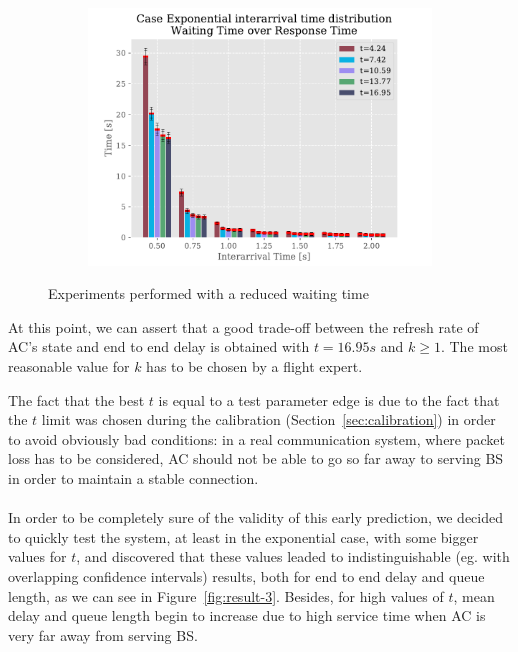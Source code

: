 \documentclass[a4paper,12pt]{article}
\begin{document}
\begin{figure}[H]
\begin{subfigure}[b]{.3\textwidth}
  \end{subfigure}
  ~
  \begin{subfigure}[b]{.3\textwidth}
    \includegraphics[width=\textwidth]{img/WaitingTimeOverResponseTimeP1Exp.pdf}
  \end{subfigure}
  \caption{Experiments performed with a reduced waiting time}
  \label{fig:result-2}
\end{figure}

At this point, we can assert that a good trade-off between the refresh rate of AC's state and end to end delay is obtained with $t=16.95s$ and $k \geq 1$.
The most reasonable value for $k$ has to be chosen by a flight expert.

The fact that the best $t$ is equal to a test parameter edge is due to the fact that the $t$ limit was chosen during the calibration (Section~\ref{sec:calibration}) in order to avoid obviously bad conditions: in a real communication system, where packet loss has to be considered, AC should not be able to go so far away to serving BS in order to maintain a stable connection.
\\
\\
In order to be completely sure of the validity of this early prediction, we decided to quickly test the system, at least in the exponential case, with some bigger values for $t$, and discovered that these values leaded to indistinguishable (eg. with overlapping confidence intervals) results, both for end to end delay and queue length, as we can see in Figure~\ref{fig:result-3}. Besides, for high values of $t$, mean delay and queue length begin to increase due to high service time when AC is very far away from serving BS.
\end{document}
